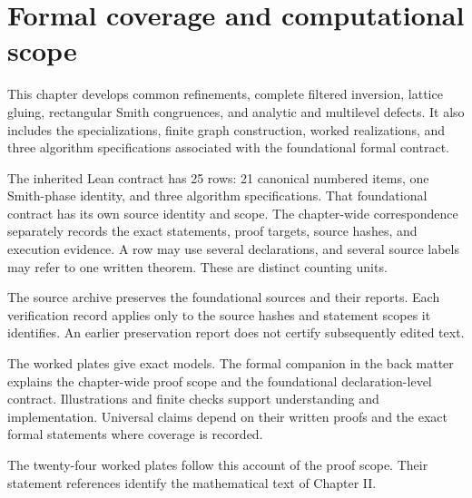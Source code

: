 \section{Formal coverage and computational scope}\label{sec:edition-scope}
This chapter develops common refinements, complete filtered inversion, lattice gluing, rectangular Smith congruences, and analytic and multilevel defects. It also includes the specializations, finite graph construction, worked realizations, and three algorithm specifications associated with the foundational formal contract.



The inherited Lean contract has 25 rows: 21 canonical numbered items, one Smith-phase identity, and three algorithm specifications. That foundational contract has its own source identity and scope. The chapter-wide correspondence separately records the exact statements, proof targets, source hashes, and execution evidence. A row may use several declarations, and several source labels may refer to one written theorem. These are distinct counting units.

The source archive preserves the foundational sources and their reports. Each verification record applies only to the source hashes and statement scopes it identifies. An earlier preservation report does not certify subsequently edited text.

The worked plates give exact models. The formal companion in the back matter explains the chapter-wide proof scope and the foundational declaration-level contract. Illustrations and finite checks support understanding and implementation. Universal claims depend on their written proofs and the exact formal statements where coverage is recorded.

The twenty-four worked plates follow this account of the proof scope. Their statement references identify the mathematical text of Chapter II.
